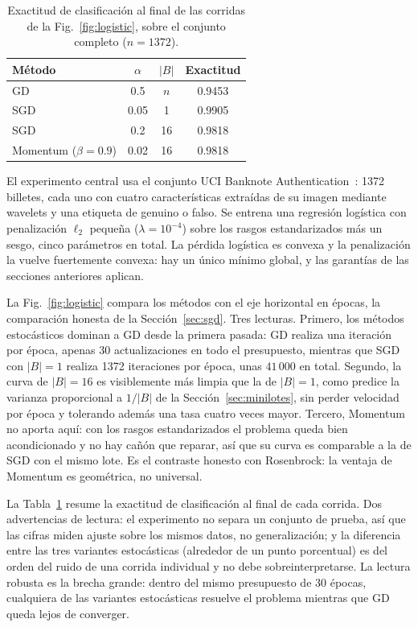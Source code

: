 \begin{table}[t]
  \caption{Exactitud de clasificación al final de las corridas de la Fig.~\ref{fig:logistic}, sobre el conjunto completo ($n = 1372$).}
  \label{tab:acc}
  \centering
  \begin{tabular}{lccc}
    \toprule
    Método & $\alpha$ & $|B|$ & Exactitud \\
    \midrule
    GD & 0.5 & $n$ & 0.9453 \\
    SGD & 0.05 & 1 & 0.9905 \\
    SGD & 0.2 & 16 & 0.9818 \\
    Momentum ($\beta = 0.9$) & 0.02 & 16 & 0.9818 \\
    \bottomrule
  \end{tabular}
\end{table}

El experimento central usa el conjunto UCI Banknote Authentication~\cite{lohweg2013}: 1372 billetes, cada uno con cuatro características extraídas de su imagen mediante wavelets y una etiqueta de genuino o falso. Se entrena una regresión logística con penalización $\ell_2$ pequeña ($\lambda = 10^{-4}$) sobre los rasgos estandarizados más un sesgo, cinco parámetros en total. La pérdida logística es convexa y la penalización la vuelve fuertemente convexa: hay un único mínimo global, y las garantías de las secciones anteriores aplican.

La Fig.~\ref{fig:logistic} compara los métodos con el eje horizontal en épocas, la comparación honesta de la Sección~\ref{sec:sgd}. Tres lecturas. Primero, los métodos estocásticos dominan a GD desde la primera pasada: GD realiza una iteración por época, apenas 30 actualizaciones en todo el presupuesto, mientras que SGD con $|B| = 1$ realiza 1372 iteraciones por época, unas $41\,000$ en total. Segundo, la curva de $|B| = 16$ es visiblemente más limpia que la de $|B| = 1$, como predice la varianza proporcional a $1/|B|$ de la Sección~\ref{sec:minilotes}, sin perder velocidad por época y tolerando además una tasa cuatro veces mayor. Tercero, Momentum no aporta aquí: con los rasgos estandarizados el problema queda bien acondicionado y no hay cañón que reparar, así que su curva es comparable a la de SGD con el mismo lote. Es el contraste honesto con Rosenbrock: la ventaja de Momentum es geométrica, no universal.

La Tabla~\ref{tab:acc} resume la exactitud de clasificación al final de cada corrida. Dos advertencias de lectura: el experimento no separa un conjunto de prueba, así que las cifras miden ajuste sobre los mismos datos, no generalización; y la diferencia entre las tres variantes estocásticas (alrededor de un punto porcentual) es del orden del ruido de una corrida individual y no debe sobreinterpretarse. La lectura robusta es la brecha grande: dentro del mismo presupuesto de 30 épocas, cualquiera de las variantes estocásticas resuelve el problema mientras que GD queda lejos de converger.

